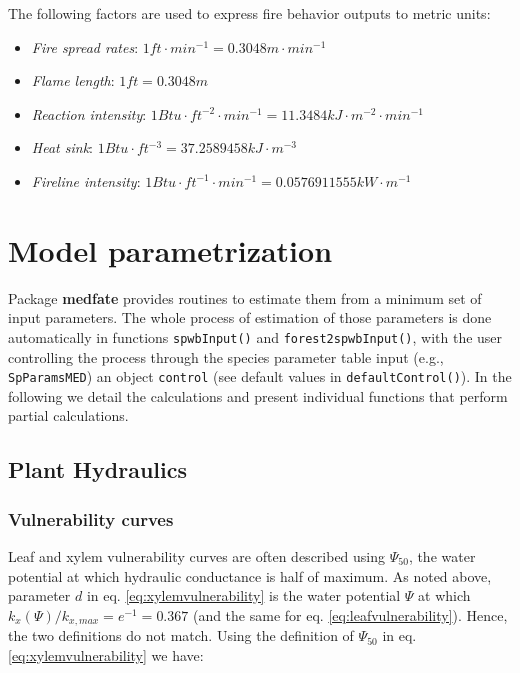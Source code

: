\documentclass[]{book}
\providecommand{\tightlist}{%
  \setlength{\itemsep}{0pt}\setlength{\parskip}{0pt}}
\begin{document}
The following factors are used to express fire behavior outputs to
metric units:

\begin{itemize}
\tightlist
\item
  \emph{Fire spread rates}:
  \(1 ft\cdot min^{-1} = 0.3048 m\cdot min^{-1}\)
\item
  \emph{Flame length}: \(1 ft = 0.3048 m\)
\item
  \emph{Reaction intensity}:
  \(1 Btu\cdot ft^{-2} \cdot min^{-1} = 11.3484 kJ \cdot m^{-2}\cdot min^{-1}\)
\item
  \emph{Heat sink}: \(1 Btu\cdot ft^{-3} = 37.2589458 kJ \cdot m^{-3}\)
\item
  \emph{Fireline intensity}:
  \(1 Btu\cdot ft^{-1} \cdot min^{-1} = 0.0576911555 kW\cdot m^{-1}\)
\end{itemize}

\appendix


\chapter{Model parametrization}\label{model-parametrization}

Package \textbf{medfate} provides routines to estimate them from a
minimum set of input parameters. The whole process of estimation of
those parameters is done automatically in functions \texttt{spwbInput()}
and \texttt{forest2spwbInput()}, with the user controlling the process
through the species parameter table input (e.g., \texttt{SpParamsMED})
an object \texttt{control} (see default values in
\texttt{defaultControl()}). In the following we detail the calculations
and present individual functions that perform partial calculations.

\section{Plant Hydraulics}\label{plant-hydraulics-1}

\subsection{Vulnerability curves}\label{vulnerability-curves-1}

Leaf and xylem vulnerability curves are often described using
\(\Psi_{50}\), the water potential at which hydraulic conductance is
half of maximum. As noted above, parameter \(d\) in eq.
\eqref{eq:xylemvulnerability} is the water potential \(\Psi\) at which
\(k_{x}(\Psi)/k_{x,max} = e^{-1} = 0.367\) (and the same for eq.
\eqref{eq:leafvulnerability}). Hence, the two definitions do not match.
Using the definition of \(\Psi_{50}\) in eq. \eqref{eq:xylemvulnerability}
we have:
\end{document}

